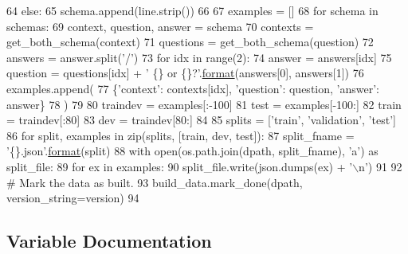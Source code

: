 \begin{DoxyCode}
64                 \textcolor{keywordflow}{else}:
65                     schema.append(line.strip())
66 
67         examples = []
68         \textcolor{keywordflow}{for} schema \textcolor{keywordflow}{in} schemas:
69             context, question, answer = schema
70             contexts = get\_both\_schema(context)
71             questions = get\_both\_schema(question)
72             answers = answer.split(\textcolor{stringliteral}{'/'})
73             \textcolor{keywordflow}{for} idx \textcolor{keywordflow}{in} range(2):
74                 answer = answers[idx]
75                 question = questions[idx] + \textcolor{stringliteral}{' \{\} or \{\}?'}.\hyperlink{namespaceparlai_1_1chat__service_1_1services_1_1messenger_1_1shared__utils_a32e2e2022b824fbaf80c747160b52a76}{format}(answers[0], answers[1])
76                 examples.append(
77                     \{\textcolor{stringliteral}{'context'}: contexts[idx], \textcolor{stringliteral}{'question'}: question, \textcolor{stringliteral}{'answer'}: answer\}
78                 )
79 
80         traindev = examples[:-100]
81         test = examples[-100:]
82         train = traindev[:80]
83         dev = traindev[80:]
84 
85         splits = [\textcolor{stringliteral}{'train'}, \textcolor{stringliteral}{'validation'}, \textcolor{stringliteral}{'test'}]
86         \textcolor{keywordflow}{for} split, examples \textcolor{keywordflow}{in} zip(splits, [train, dev, test]):
87             split\_fname = \textcolor{stringliteral}{'\{\}.json'}.\hyperlink{namespaceparlai_1_1chat__service_1_1services_1_1messenger_1_1shared__utils_a32e2e2022b824fbaf80c747160b52a76}{format}(split)
88             with open(os.path.join(dpath, split\_fname), \textcolor{stringliteral}{'a'}) \textcolor{keyword}{as} split\_file:
89                 \textcolor{keywordflow}{for} ex \textcolor{keywordflow}{in} examples:
90                     split\_file.write(json.dumps(ex) + \textcolor{stringliteral}{'\(\backslash\)n'})
91 
92         \textcolor{comment}{# Mark the data as built.}
93         build\_data.mark\_done(dpath, version\_string=version)
94 \end{DoxyCode}


\subsection{Variable Documentation}
\mbox{\label{namespaceparlai_1_1tasks_1_1mwsc_1_1build_a7b7842b18b674a1b523b16617f65908a}} 
